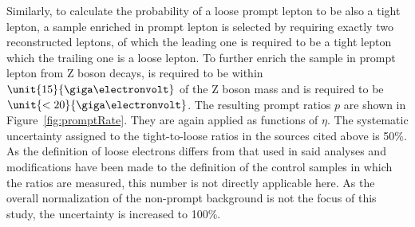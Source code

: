 Similarly, to calculate the probability of a loose prompt lepton to be also a tight lepton, a sample enriched in prompt lepton is selected by requiring exactly two reconstructed leptons, of which the leading one is required to be a tight lepton which the trailing one is a loose lepton. To further enrich the sample in prompt lepton from Z boson decays, \mll is required to be within $\unit{15}{\giga\electronvolt}$ of the Z boson mass and \MET is required to be $\unit{<20}{\giga\electronvolt}$. The resulting prompt ratios $p$ are shown in Figure~\ref{fig:promptRate}. They are again applied as functions of \pt $\eta$. The systematic uncertainty assigned to the tight-to-loose ratios in the sources cited above is 50\%. As the definition of loose electrons differs from that used in said analyses and modifications have been made to the definition of the control samples in which the ratios are measured, this number is not directly applicable here. As the overall normalization of the non-prompt background is not the focus of this study, the uncertainty is increased to 100\%. 

